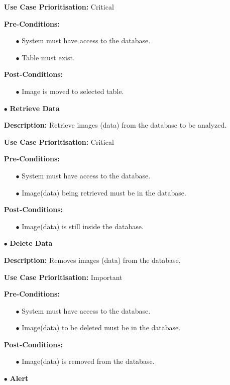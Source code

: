 \documentclass[a4paper,12pt]{report}
\begin{document}
\begin{itemize}
		\textbf{Use Case Prioritisation:} Critical\newline

		\textbf{Pre-Conditions:}
		\begin{itemize}
			\item[$\bullet$]System must have access to the database.
			\item[$\bullet$]Table must exist.
			\\
		\end{itemize}
		\textbf{Post-Conditions: }
		\begin{itemize}
			\item[$\bullet$]Image is moved to selected table.
			\\
		\end{itemize}
		\item[$\bullet$]\textbf{Retrieve Data}\newline

		\textbf{Description:} Retrieve images (data) from the database to be analyzed.\newline
		
		\textbf{Use Case Prioritisation:} Critical\newline

		\textbf{Pre-Conditions:}
		\begin{itemize}
			\item[$\bullet$]System must have access to the database.
			\item[$\bullet$]Image(data) being retrieved must be in the database.
			\\
		\end{itemize}
		\textbf{Post-Conditions: }
		\begin{itemize}
			\item[$\bullet$]Image(data) is still inside the database.
			\\
		\end{itemize}
		\newpage
		\item[$\bullet$]\textbf{Delete Data}\newline

		\textbf{Description:} Removes images (data) from the database.\newline
		
		\textbf{Use Case Prioritisation:} Important\newline

		\textbf{Pre-Conditions:}
		\begin{itemize}
			\item[$\bullet$]System must have access to the database.
			\item[$\bullet$]Image(data) to be deleted must be in the database.
			\\
		\end{itemize}
		\textbf{Post-Conditions: }
		\begin{itemize}
			\item[$\bullet$]Image(data) is removed from the database.
			\\
		\end{itemize}
		\item[$\bullet$]\textbf{Alert}\newline


\end{itemize}
\end{document}
